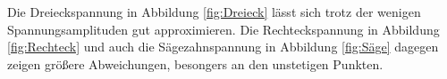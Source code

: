 Die Dreieckspannung in Abbildung \ref{fig:Dreieck} lässt sich trotz der wenigen Spannungsamplituden
gut approximieren. Die Rechteckspannung in Abbildung \ref{fig:Rechteck} und auch die
Sägezahnspannung in Abbildung \ref{fig:Säge} dagegen zeigen größere Abweichungen, besongers
an den unstetigen Punkten.


